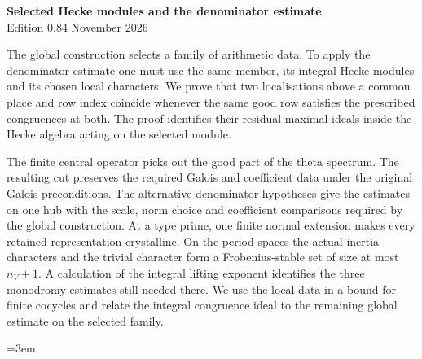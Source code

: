\begin{center}
{\Large\bfseries Selected Hecke modules and the denominator estimate}\\[4pt]
Edition 0.84  November 2026
\end{center}

The global construction selects a family of arithmetic data. To apply
the denominator estimate one must use the same member, its integral
Hecke modules and its chosen local characters. We prove that two
localisations above a common place and row index coincide whenever
the same good row satisfies the prescribed congruences at both.
The proof identifies their residual maximal ideals inside the Hecke
algebra acting on the selected module.

The finite central operator picks out the good part of the theta
spectrum. The resulting cut preserves the required Galois and
coefficient data under the original Galois preconditions.
The alternative denominator hypotheses give the estimates on one
hub with the scale, norm choice and coefficient comparisons required
by the global construction. At a type prime, one finite normal
extension makes every retained representation crystalline.
On the period spaces the actual inertia characters and the trivial
character form a Frobenius-stable set of size at most $n_V+1$.
A calculation of the integral lifting exponent identifies the three
monodromy estimates still needed there. We use the local data in a
bound for finite cocycles and relate
the integral congruence ideal to the remaining global estimate
on the selected family.

\begingroup\emergencystretch=3em












\endgroup
